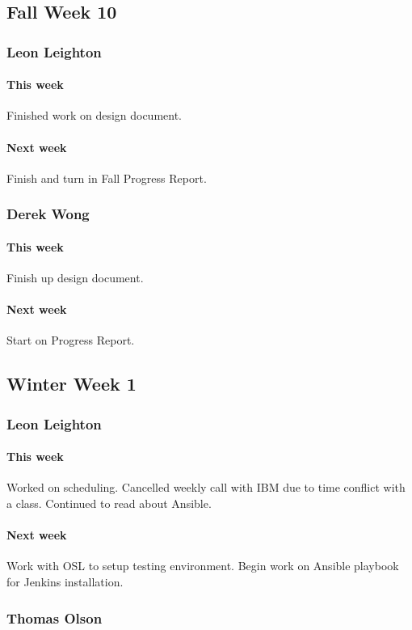 \documentclass[10pt,letterpaper,onecolumn,draftclsnofoot]{IEEEtran}
\begin{document}
\subsection{Fall Week 10}
\subsubsection{Leon Leighton}
\paragraph{This week}Finished work on design document.
\paragraph{Next week}Finish and turn in Fall Progress Report.

\subsubsection{Derek Wong}
\paragraph{This week}Finish up design document.
\paragraph{Next week}Start on Progress Report.

\subsection{Winter Week 1}
\subsubsection{Leon Leighton}
\paragraph{This week}Worked on scheduling. Cancelled weekly call with IBM due to time conflict with a class.  
Continued to read about Ansible.
\paragraph{Next week}Work with OSL to setup testing environment.  
Begin work on Ansible playbook for Jenkins installation.


\subsubsection{Thomas Olson}
\end{document}
